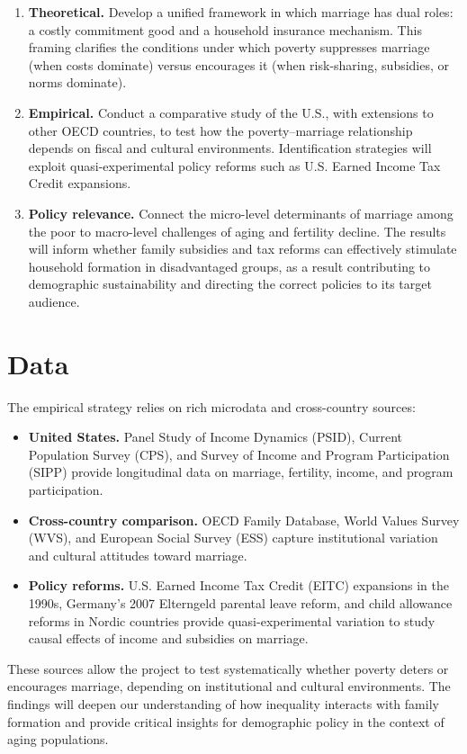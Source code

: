 \begin{enumerate}
\item \textbf{Theoretical.} Develop a unified framework in which marriage has dual roles: a costly commitment good and a household insurance mechanism. This framing clarifies the conditions under which poverty suppresses marriage (when costs dominate) versus encourages it (when risk-sharing, subsidies, or norms dominate).
\item \textbf{Empirical.} Conduct a comparative study of the U.S., with extensions to other OECD countries, to test how the poverty–marriage relationship depends on fiscal and cultural environments. Identification strategies will exploit quasi-experimental policy reforms such as U.S. Earned Income Tax Credit expansions.
\item \textbf{Policy relevance.} Connect the micro-level determinants of marriage among the poor to macro-level challenges of aging and fertility decline. The results will inform whether family subsidies and tax reforms can effectively stimulate household formation in disadvantaged groups, as a result contributing to demographic sustainability and directing the correct policies to its target audience.
\end{enumerate}

\section*{Data}

The empirical strategy relies on rich microdata and cross-country sources:

\begin{itemize}
\item \textbf{United States.} Panel Study of Income Dynamics (PSID), Current Population Survey (CPS), and Survey of Income and Program Participation (SIPP) provide longitudinal data on marriage, fertility, income, and program participation.
\item \textbf{Cross-country comparison.} OECD Family Database, World Values Survey (WVS), and European Social Survey (ESS) capture institutional variation and cultural attitudes toward marriage.
\item \textbf{Policy reforms.} U.S. Earned Income Tax Credit (EITC) expansions in the 1990s, Germany’s 2007 Elterngeld parental leave reform, and child allowance reforms in Nordic countries provide quasi-experimental variation to study causal effects of income and subsidies on marriage.
\end{itemize}

These sources allow the project to test systematically whether poverty deters or encourages marriage, depending on institutional and cultural environments. The findings will deepen our understanding of how inequality interacts with family formation and provide critical insights for demographic policy in the context of aging populations.

\newpage







